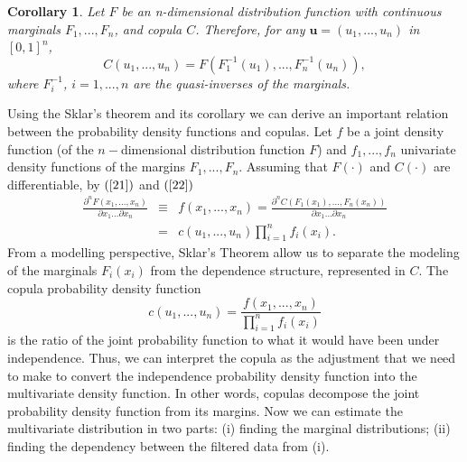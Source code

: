 \documentclass[a4paper,10pt]{article}
\newtheorem{corollary}{Corollary}[theorem]
\begin{document}
\bigskip

\begin{corollary}
	Let $F$ be an n-dimensional distribution function with continuous marginals $%
	F_{1},...,F_{n}$, and copula $C$. Therefore, for any $\mathbf{u}=\left(
	u_{1},...,u_{n}\right) $ in $\left[ 0,1\right] ^{n}$,
	\begin{equation}
	C\left( u_{1},...,u_{n}\right) =F\left( F_{1}^{-1}\left( u_{1}\right)
	,...,F_{n}^{-1}\left( u_{n}\right) \right) ,  \label{22}
	\end{equation}
	where $F_{i}^{-1}$, $i=1,...,n$ are the quasi-inverses of the marginals.
\end{corollary}

Using the Sklar's theorem and its corollary we can derive an important
relation between the probability density functions and copulas. Let $f$ be a
joint density function (of the $n-$dimensional distribution function $F$)
and $f_{1},...,f_{n}$ univariate density functions of the margins $%
F_{1},...,F_{n}$. Assuming that $F\left( \cdot \right) $ and $C\left( \cdot
\right) $ are differentiable, by $\left( \ref{21}\right) $ and $\left( \ref%
{22}\right) $
\begin{eqnarray}
\frac{\partial ^{n}F\left( x_{1},...,x_{n}\right) }{\partial
	x_{1}...\partial x_{n}} &\equiv &f\left( x_{1},...,x_{n}\right) =\frac{
	\partial ^{n}C\left( F_{1}\left( x_{1}\right) ,...,F_{n}\left( x_{n}\right)
	\right) }{\partial x_{1}...\partial x_{n}} \\
&=&c\left( u_{1},...,u_{n}\right) \prod_{i=1}^{n}f_{i}\left( x_{i}\right) .
\label{23}
\end{eqnarray}%
From a modelling perspective, Sklar's Theorem allow us to separate the
modeling of the marginals $F_{i}\left( x_{i}\right) $ from the dependence
structure, represented in $C$. The copula probability density function
\begin{equation}
c\left( u_{1},...,u_{n}\right) =\frac{f\left( x_{1},...,x_{n}\right) }{
	\prod_{i=1}^{n}f_{i}\left( x_{i}\right) }  \label{24}
\end{equation}%
is the ratio of the joint probability function to what it would have been
under independence. Thus, we can interpret the copula as the adjustment that
we need to make to convert the independence probability density function
into the multivariate density function. In other words, copulas decompose
the joint probability density function from its margins. Now we can estimate
the multivariate distribution in two parts: (i) finding the marginal
distributions; (ii) finding the dependency between the filtered data from
(i). 
\end{document}
